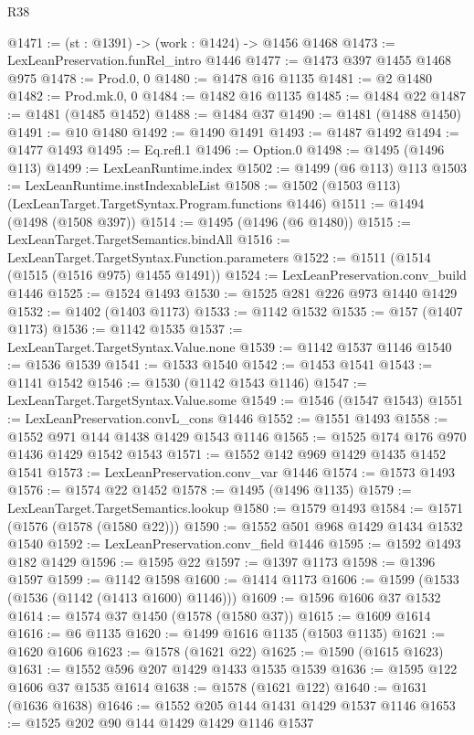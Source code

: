 \begin{lexlean}{R38}
\begin{coremodule}
@1471 := (st : @1391) -> (work : @1424) -> @1456 @1468
@1473 := LexLeanPreservation.funRel_intro @1446
@1477 := @1473 @397 @1455 @1468 @975
@1478 := Prod.{0, 0}
@1480 := @1478 @16 @1135
@1481 := @2 @1480
@1482 := Prod.mk.{0, 0}
@1484 := @1482 @16 @1135
@1485 := @1484 @22
@1487 := @1481 (@1485 @1452)
@1488 := @1484 @37
@1490 := @1481 (@1488 @1450)
@1491 := @10 @1480
@1492 := @1490 @1491
@1493 := @1487 @1492
@1494 := @1477 @1493
@1495 := Eq.refl.{1}
@1496 := Option.{0}
@1498 := @1495 (@1496 @113)
@1499 := LexLeanRuntime.index
@1502 := @1499 (@6 @113) @113
@1503 := LexLeanRuntime.instIndexableList
@1508 := @1502 (@1503 @113) (LexLeanTarget.TargetSyntax.Program.functions @1446)
@1511 := @1494 (@1498 (@1508 @397))
@1514 := @1495 (@1496 (@6 @1480))
@1515 := LexLeanTarget.TargetSemantics.bindAll
@1516 := LexLeanTarget.TargetSyntax.Function.parameters
@1522 := @1511 (@1514 (@1515 (@1516 @975) @1455 @1491))
@1524 := LexLeanPreservation.conv_build @1446
@1525 := @1524 @1493
@1530 := @1525 @281 @226 @973 @1440 @1429
@1532 := @1402 (@1403 @1173)
@1533 := @1142 @1532
@1535 := @157 (@1407 @1173)
@1536 := @1142 @1535
@1537 := LexLeanTarget.TargetSyntax.Value.none
@1539 := @1142 @1537 @1146
@1540 := @1536 @1539
@1541 := @1533 @1540
@1542 := @1453 @1541
@1543 := @1141 @1542
@1546 := @1530 (@1142 @1543 @1146)
@1547 := LexLeanTarget.TargetSyntax.Value.some
@1549 := @1546 (@1547 @1543)
@1551 := LexLeanPreservation.convL_cons @1446
@1552 := @1551 @1493
@1558 := @1552 @971 @144 @1438 @1429 @1543 @1146
@1565 := @1525 @174 @176 @970 @1436 @1429 @1542 @1543
@1571 := @1552 @142 @969 @1429 @1435 @1452 @1541
@1573 := LexLeanPreservation.conv_var @1446
@1574 := @1573 @1493
@1576 := @1574 @22 @1452
@1578 := @1495 (@1496 @1135)
@1579 := LexLeanTarget.TargetSemantics.lookup
@1580 := @1579 @1493
@1584 := @1571 (@1576 (@1578 (@1580 @22)))
@1590 := @1552 @501 @968 @1429 @1434 @1532 @1540
@1592 := LexLeanPreservation.conv_field @1446
@1595 := @1592 @1493 @182 @1429
@1596 := @1595 @22
@1597 := @1397 @1173
@1598 := @1396 @1597
@1599 := @1142 @1598
@1600 := @1414 @1173
@1606 := @1599 (@1533 (@1536 (@1142 (@1413 @1600) @1146)))
@1609 := @1596 @1606 @37 @1532
@1614 := @1574 @37 @1450 (@1578 (@1580 @37))
@1615 := @1609 @1614
@1616 := @6 @1135
@1620 := @1499 @1616 @1135 (@1503 @1135)
@1621 := @1620 @1606
@1623 := @1578 (@1621 @22)
@1625 := @1590 (@1615 @1623)
@1631 := @1552 @596 @207 @1429 @1433 @1535 @1539
@1636 := @1595 @122 @1606 @37 @1535 @1614
@1638 := @1578 (@1621 @122)
@1640 := @1631 (@1636 @1638)
@1646 := @1552 @205 @144 @1431 @1429 @1537 @1146
@1653 := @1525 @202 @90 @144 @1429 @1429 @1146 @1537

\end{coremodule}
\end{lexlean}
